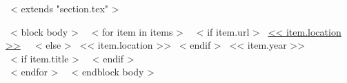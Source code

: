 ~< extends "section.tex" >~

~< block body >~
  ~< for item in items >~
    ~< if item.url >~
      \href{<< item.url >>}{<< item.location >>}
      \,\, {\scriptsize
        \color{gray}{<< item.details >>}
      }
    ~< else >~
      << item.location >>
  ~< endif >~
  \hfill << item.year >> \\
   ~< if item.title >~
   {\scriptsize
        \textit{\color{gray}{<< item.title >>}}
      } \vspace{3mm}
   ~< endif >~ \\
  ~< endfor >~
~< endblock body >~
